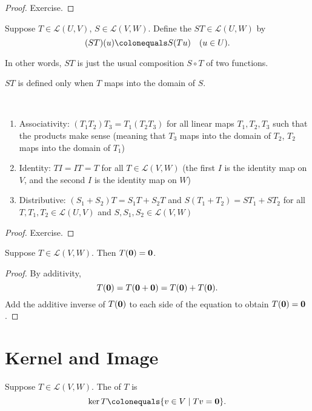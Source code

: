 \begin{proof}
Exercise.
\end{proof}

\begin{definition}
Suppose $T\in\mathcal{L}(U,V)$, $S\in\mathcal{L}(V,W)$. Define the  $ST\in\mathcal{L}(U,W)$ by
\[(ST)(u)\colonequals S(Tu)\quad(u\in U).\]
\end{definition}

In other words, $ST$ is just the usual composition $S\circ T$ of two functions.

\begin{remark}
$ST$ is defined only when $T$ maps into the domain of $S$.
\end{remark}

\begin{lemma} \
\begin{enumerate}[label=(\roman*)]
\item Associativity: $(T_1T_2)T_3=T_1(T_2T_3)$ for all linear maps $T_1,T_2,T_3$ such that the products make sense (meaning that $T_3$ maps into the domain of $T_2$, $T_2$ maps into the domain of $T_1$)
\item Identity: $TI=IT=T$ for all $T\in\mathcal{L}(V,W)$ (the first $I$ is the identity map on $V$, and the second $I$ is the identity map on $W$)
\item Distributive: $(S_1+S_2)T=S_1T+S_2T$ and $S(T_1+T_2)=ST_1+ST_2$ for all $T,T_1,T_2\in\mathcal{L}(U,V)$ and $S,S_1,S_2\in\mathcal{L}(V,W)$
\end{enumerate}
\end{lemma}

\begin{proof}
Exercise.
\end{proof}

\begin{lemma}\label{lemma:linear-map-0-0}
Suppose $T\in\mathcal{L}(V,W)$. Then $T(\vb{0})=\vb{0}$.
\end{lemma}

\begin{proof}
By additivity,
\[T(\vb{0})=T(\vb{0}+\vb{0})=T(\vb{0})+T(\vb{0}).\]
Add the additive inverse of $T(\vb{0})$ to each side of the equation to obtain $T(\vb{0})=\vb{0}$.
\end{proof}
\pagebreak

\section{Kernel and Image}
\begin{definition}[Kernel]
Suppose $T\in\mathcal{L}(V,W)$. The  of $T$ is
\[\ker T\colonequals\{v\in V\mid Tv=\vb{0}\}.\]
\end{definition}

